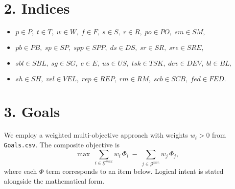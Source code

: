 \documentclass[11pt,a4paper]{article}
\begin{document}
\section{2. Indices}
\begin{itemize}[leftmargin=2em]
  \item $p\in P,\; t\in T,\; w\in W,\; f\in F,\; s\in S,\; r\in R,\; po\in PO,\; sm\in SM,$
  \item $pb\in PB,\; sp\in SP,\; spp\in SPP,\; ds\in DS,\; sr\in SR,\; sre\in SRE,$
  \item $sbl\in SBL,\; sg\in SG,\; e\in E,\; us\in US,\; tsk\in TSK,\; dev\in DEV,\; bl\in BL,$
  \item $sh\in SH,\; vel\in VEL,\; rep\in REP,\; rm\in RM,\; scb\in SCB,\; fed\in FED.$
\end{itemize}

\section{3. Goals}
\noindent
We employ a weighted multi-objective approach with weights $w_i>0$ from \texttt{Goals.csv}. The composite objective is
\[
\max\; \sum_{i\in\mathcal{G}^{max}} w_i\,\Phi_i \;-\; \sum_{j\in\mathcal{G}^{min}} w_j\,\Phi_j,
\]
where each $\Phi$ term corresponds to an item below. Logical intent is stated alongside the mathematical form.
\end{document}
